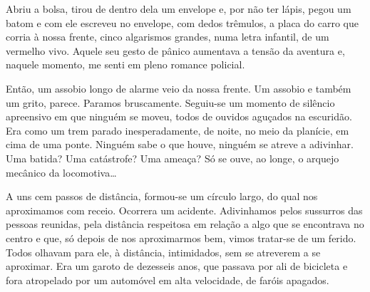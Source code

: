 
Abriu a bolsa, tirou de dentro dela um envelope e, por não ter lápis,
pegou um batom e com ele escreveu no envelope, com dedos trêmulos, a
placa do carro que corria à nossa frente, cinco algarismos grandes, numa
letra infantil, de um vermelho vivo. Aquele seu gesto de pânico
aumentava a tensão da aventura e, naquele momento, me senti em pleno
romance policial.

Então, um assobio longo de alarme veio da nossa frente. Um assobio e
também um grito, parece. Paramos bruscamente. Seguiu-se um momento de
silêncio apreensivo em que ninguém se moveu, todos de ouvidos aguçados
na escuridão. Era como um trem parado inesperadamente, de noite, no meio
da planície, em cima de uma ponte. Ninguém sabe o que houve, ninguém se
atreve a adivinhar. Uma batida? Uma catástrofe? Uma ameaça? Só se ouve,
ao longe, o arquejo mecânico da locomotiva\ldots{}


A uns cem passos de distância, formou-se um círculo largo, do qual nos
aproximamos com receio. Ocorrera um acidente. Adivinhamos pelos
sussurros das pessoas reunidas, pela distância respeitosa em relação a
algo que se encontrava no centro e que, só depois de nos aproximarmos
bem, vimos tratar-se de um ferido. Todos olhavam para ele, à distância,
intimidados, sem se atreverem a se aproximar. Era um garoto de dezesseis
anos, que passava por ali de bicicleta e fora atropelado por um
automóvel em alta velocidade, de faróis apagados.


